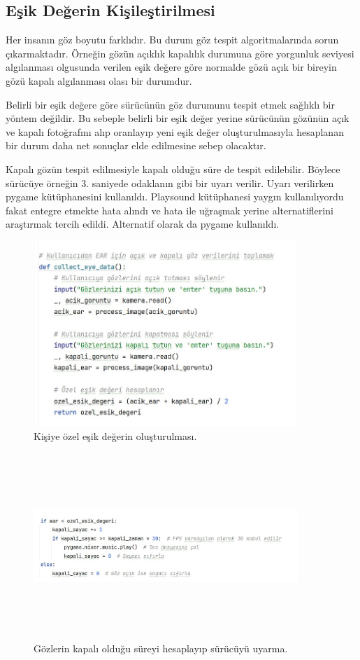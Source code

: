 \documentclass[12pt, a4paper]{article}
\begin{document}
	\subsection{ Eşik Değerin Kişileştirilmesi} 
	
	Her insanın göz boyutu farklıdır. Bu durum göz tespit algoritmalarında sorun çıkarmaktadır. Örneğin gözün açıklık kapalılık durumuna göre yorgunluk seviyesi algılanması olgusunda verilen eşik değere göre normalde gözü açık bir bireyin gözü kapalı algılanması olası bir durumdur.\par Belirli bir eşik değere göre sürücünün göz durumunu tespit etmek sağlıklı bir yöntem değildir. Bu sebeple belirli bir eşik değer yerine sürücünün gözünün açık ve kapalı fotoğrafını alıp oranlayıp yeni eşik değer oluşturulmasıyla hesaplanan bir durum daha net sonuçlar elde edilmesine sebep olacaktır.\par Kapalı gözün tespit edilmesiyle kapalı olduğu süre de tespit edilebilir. Böylece sürücüye örneğin 3. saniyede odaklanın gibi bir uyarı verilir. Uyarı verilirken pygame kütüphanesini kullanıldı. Playsound kütüphanesi yaygın kullanılıyordu fakat entegre etmekte hata alındı ve hata ile uğraşmak yerine alternatiflerini araştırmak tercih edildi. Alternatif olarak da pygame kullanıldı.
	
	\begin{figure}
		\centering
		\includegraphics[width=10cm, height=7cm, keepaspectratio]{ozelgoz.jpg}
		\caption{Kişiye özel eşik değerin oluşturulması.}
	\end{figure}
	\begin{figure}
		\centering
		\includegraphics[width=10cm, height=7cm, keepaspectratio]{gozkapaliligi.jpg}
		\caption{Gözlerin kapalı olduğu süreyi hesaplayıp sürücüyü uyarma.}
	\end{figure}\newpage
\end{document}
